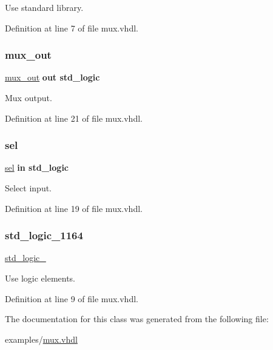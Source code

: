 Use standard library. 



Definition at line 7 of file mux.\+vhdl.

\mbox{\label{classmux__using__with_ab93734a6ea826ed134ddfc695b3a04b4}} 
\subsubsection{\texorpdfstring{mux\_out}{mux\_out}}
{\footnotesize\ttfamily \mbox{\hyperlink{classmux__using__with_ab93734a6ea826ed134ddfc695b3a04b4}{mux\+\_\+out}} {\bfseries \textcolor{keywordflow}{out}\textcolor{vhdlchar}{ }} {\bfseries \textcolor{keywordtype}{std\+\_\+logic}\textcolor{vhdlchar}{ }} \hspace{0.3cm}{\ttfamily [Port]}}



Mux output. 



Definition at line 21 of file mux.\+vhdl.

\mbox{\label{classmux__using__with_a00d652a26316e86f236042f42bcc035d}} 
\subsubsection{\texorpdfstring{sel}{sel}}
{\footnotesize\ttfamily \mbox{\hyperlink{classmux__using__with_a00d652a26316e86f236042f42bcc035d}{sel}} {\bfseries \textcolor{keywordflow}{in}\textcolor{vhdlchar}{ }} {\bfseries \textcolor{keywordtype}{std\+\_\+logic}\textcolor{vhdlchar}{ }} \hspace{0.3cm}{\ttfamily [Port]}}



Select input. 



Definition at line 19 of file mux.\+vhdl.

\mbox{\label{classmux__using__with_ae984d6918908b859c4f9c9a950a0cfee}} 
\subsubsection{\texorpdfstring{std\_logic\_1164}{std\_logic\_1164}}
{\footnotesize\ttfamily \mbox{\hyperlink{classmux__using__with_ae984d6918908b859c4f9c9a950a0cfee}{std\+\_\+logic\+\_}}\hspace{0.3cm}{\ttfamily [use clause]}}



Use logic elements. 



Definition at line 9 of file mux.\+vhdl.



The documentation for this class was generated from the following file\+:\begin{DoxyCompactItemize}
\item 
examples/\mbox{\hyperlink{mux_8vhdl}{mux.\+vhdl}}\end{DoxyCompactItemize}
